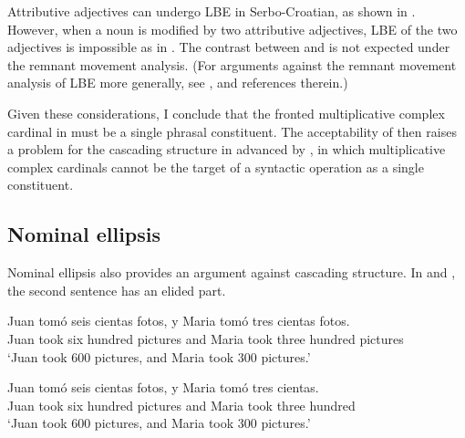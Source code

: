 \documentclass[output=paper]{langscibook}
\begin{document}
\z

\noindent Attributive adjectives can undergo LBE in Serbo-Croatian, as shown in . However, when a noun is modified by two attributive adjectives, LBE of the two adjectives is impossible as in  \citep{Boskovic2005}. The contrast between  and  is not expected under the remnant movement analysis. (For arguments against the remnant movement analysis of LBE more generally, see \citealt{Boskovic2005,Stjepanovic2010, Stjepanovic2011,Despic2011,Talic2017}, and references therein.)

Given these considerations, I conclude that the fronted multiplicative complex cardinal in  must be a single phrasal constituent. The acceptability of  then raises a problem for the cascading structure in  advanced by \citet{IoninMatushansky2018}, in which multiplicative complex cardinals cannot be the target of a syntactic operation as a single constituent.

\subsection{Nominal ellipsis}\label{tat:sec:ne}
Nominal ellipsis also provides an argument against  cascading structure. In  and , the second sentence has an elided part.

\ea\label{tat:elip}
\ea\label{tat:elipa}
\gll Juan tomó seis cientas fotos, y Maria tomó tres cientas fotos.\\  
     Juan took six hundred pictures and Maria took three hundred pictures\\ 
\glt `Juan took 600 pictures, and Maria took 300 pictures.'

\ex\label{tat:elipb}
\gll Juan tomó seis cientas fotos, y Maria tomó tres cientas.\\  
    Juan took six hundred pictures and Maria took three hundred\\ 
\glt `Juan took 600 pictures, and Maria took 300 pictures.'
\end{document}
